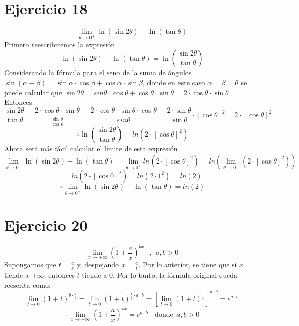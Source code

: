 \documentclass[12pt]{article}
\begin{document}
\section{Ejercicio 18}
\[
\lim_{\theta \to 0^+} \ln (\sin 2\theta) - \ln (\tan \theta)
\]
Primero reescribiremos la expresión
\[
 \ln (\sin 2\theta) - \ln (\tan \theta) = \ln ( \frac{\sin 2\theta}{\tan \theta} ) 
\]
Considerando la fórmula para el seno de la suma de ángulos $ \sin (\alpha + \beta) = \sin \alpha \cdot \cos \beta + \cos \alpha \cdot \sin \beta $, donde en este caso $\alpha = \beta = \theta$ se puede calcular que $\sin 2\theta = sin \theta \cdot \cos \theta  + \cos \theta  \cdot \sin \theta   = 2 \cdot \cos \theta  \cdot \sin \theta $ \\
Entonces 
\[
 \frac{\sin 2\theta}{\tan \theta} = \frac{ 2 \cdot \cos \theta  \cdot \sin \theta}{\frac{\sin \theta}{\cos \theta}} = \frac{2 \cdot \cos \theta  \cdot \sin \theta \cdot \cos \theta}{sin \theta} = \frac{2 \cdot \sin \theta}{\sin \theta} \cdot [\cos \theta]^{2} = 2 \cdot [\cos \theta]^{2}
\]
\[
\therefore \ln ( \frac{ \sin 2 \theta }{ \tan \theta} ) = ln ( 2 \cdot [\cos \theta]^{2} )
\]
Ahora será más fácil calcular el límite de esta expresión
\[
\lim_{\theta \to 0^+} \ln (\sin 2\theta) - \ln (\tan \theta) = \lim_{\theta \to 0^+}  ln ( 2 \cdot [\cos \theta]^{2} ) =  ln ( \lim_{\theta \to 0^+} ( 2 \cdot [\cos \theta]^{2} )) 
\]
\[
= ln (  2 \cdot [\cos 0]^{2}) =ln (  2 \cdot 1^{2})  = ln (2) 
\]
\[
\therefore \lim_{\theta \to 0^+} \ln (\sin 2\theta) - \ln (\tan \theta) =  ln (2) 
\]
\section{Ejercicio 20}
\[
\lim_{x \to + \infty} (1+\frac{a}{x})^{bx} ~ ~ ~,~ ~ a,b>0
\]
Supongamos que $t=\frac{a}{x}$ y, despejando $x=\frac{a}{t}$. Por lo anterior, se tiene que si $x$ tiende a $+ \infty$, entonces $t$ tiende a $0$. Por lo tanto, la fórmula original queda reescrita como:
\[
\lim_{t \to 0} (1+t)^{b \cdot \frac{a}{t}}
= \lim_{t \to 0} (1+t)^{\frac{1}{t} \cdot a \cdot b}
= [\lim_{t \to 0} (1+t)^{\frac{1}{t}}]^{a \cdot b}
= e^{a \cdot b}
\]
\[
\therefore \lim_{x \to + \infty} (1+\frac{a}{x})^{bx}
= e^{a \cdot b}
 ~ ~ ~ ~\text{donde}~ ~ a,b>0
\]

\end{document}
